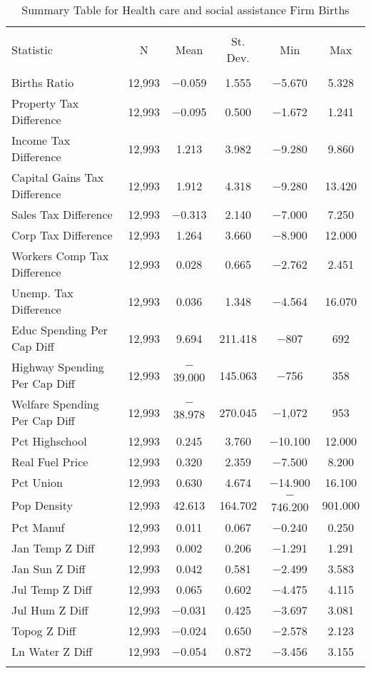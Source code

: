
\begin{table}[!htbp] \centering 
  \caption{Summary Table for  Health care and social assistance Firm Births} 
  \label{62summary} 
\begin{tabular}{@{\extracolsep{5pt}}lccccc} 
\\[-1.8ex]\hline 
\hline \\[-1.8ex] 
Statistic & \multicolumn{1}{c}{N} & \multicolumn{1}{c}{Mean} & \multicolumn{1}{c}{St. Dev.} & \multicolumn{1}{c}{Min} & \multicolumn{1}{c}{Max} \\ 
\hline \\[-1.8ex] 
Births Ratio & 12,993 & $-$0.059 & 1.555 & $-$5.670 & 5.328 \\ 
Property Tax Difference & 12,993 & $-$0.095 & 0.500 & $-$1.672 & 1.241 \\ 
Income Tax Difference & 12,993 & 1.213 & 3.982 & $-$9.280 & 9.860 \\ 
Capital Gains Tax Difference & 12,993 & 1.912 & 4.318 & $-$9.280 & 13.420 \\ 
Sales Tax Difference & 12,993 & $-$0.313 & 2.140 & $-$7.000 & 7.250 \\ 
Corp Tax Difference & 12,993 & 1.264 & 3.660 & $-$8.900 & 12.000 \\ 
Workers Comp Tax Difference & 12,993 & 0.028 & 0.665 & $-$2.762 & 2.451 \\ 
Unemp. Tax Difference & 12,993 & 0.036 & 1.348 & $-$4.564 & 16.070 \\ 
Educ Spending Per Cap Diff & 12,993 & 9.694 & 211.418 & $-$807 & 692 \\ 
Highway Spending Per Cap Diff & 12,993 & $-$39.000 & 145.063 & $-$756 & 358 \\ 
Welfare Spending Per Cap Diff & 12,993 & $-$38.978 & 270.045 & $-$1,072 & 953 \\ 
Pct Highschool & 12,993 & 0.245 & 3.760 & $-$10.100 & 12.000 \\ 
Real Fuel Price & 12,993 & 0.320 & 2.359 & $-$7.500 & 8.200 \\ 
Pct Union & 12,993 & 0.630 & 4.674 & $-$14.900 & 16.100 \\ 
Pop Density & 12,993 & 42.613 & 164.702 & $-$746.200 & 901.000 \\ 
Pct Manuf & 12,993 & 0.011 & 0.067 & $-$0.240 & 0.250 \\ 
Jan Temp Z Diff & 12,993 & 0.002 & 0.206 & $-$1.291 & 1.291 \\ 
Jan Sun Z Diff & 12,993 & 0.042 & 0.581 & $-$2.499 & 3.583 \\ 
Jul Temp Z Diff & 12,993 & 0.065 & 0.602 & $-$4.475 & 4.115 \\ 
Jul Hum Z Diff & 12,993 & $-$0.031 & 0.425 & $-$3.697 & 3.081 \\ 
Topog Z Diff & 12,993 & $-$0.024 & 0.650 & $-$2.578 & 2.123 \\ 
Ln Water Z Diff & 12,993 & $-$0.054 & 0.872 & $-$3.456 & 3.155 \\ 
\hline \\[-1.8ex] 
\end{tabular} 
\end{table} 
